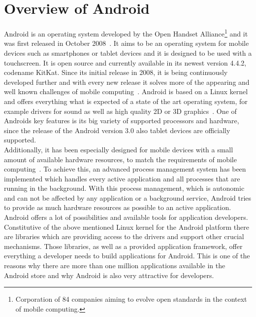 \section{Overview of Android}
\label{sec:overview:overview-of-android}
Android is an operating system developed by the Open Handset Alliance\footnote{Corporation of 84 companies aiming to evolve open standards in the context of mobile computing.} and it was first released in October 2008~\cite{developers2011android}.
It aims to be an operating system for mobile devices such as smartphones or tablet devices and it is designed to be used with a touchscreen.
It is open source and currently available in its newest version 4.4.2, codename KitKat.
Since its initial release in 2008, it is being continuously developed further and with every new release it solves more of the appearing and well known challenges of mobile computing~\cite{forman1994challenges}.
Android is based on a Linux kernel and offers everything what is expected of a state of the art operating system, for example drivers for sound as well as high quality 2D or 3D graphics~\cite{burnette2009hello}.
One of Androids key features is its big variety of supported processors and hardware, since the release of the Android version 3.0 also tablet devices are officially supported.\\
Additionally, it has been especially designed for mobile devices with a small amount of available hardware resources, to match the requirements of mobile computing~\cite{nosrati2012mobile}.
To achieve this, an advanced process management system has been implemented which handles every active application and all processes that are running in the background.
With this process management, which is autonomic and can not be affected by any application or a background service, Android tries to provide as much hardware resources as possible to an active application.\\
Android offers a lot of possibilities and available tools for application developers.
Constitutive of the above mentioned Linux kernel for the Android platform there are libraries which are providing access to the drivers and support other crucial mechanisms. 
Those libraries, as well as a provided application framework, offer everything a developer needs to build applications for Android.
This is one of the reasons why there are more than one million applications available in the Android store and why Android is also very attractive for developers.\\

